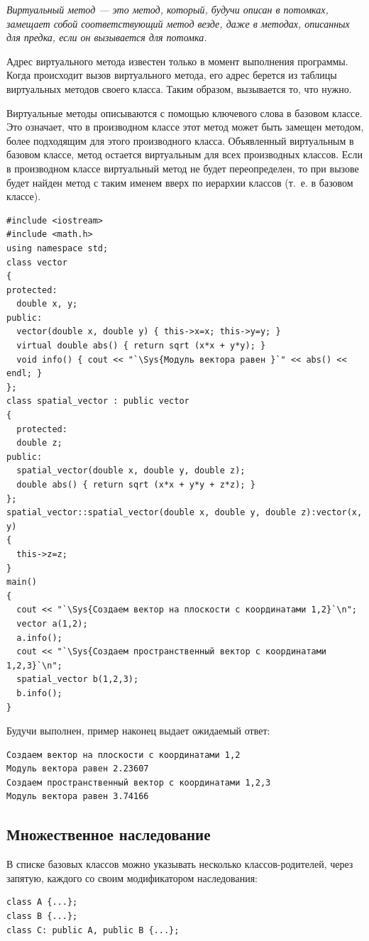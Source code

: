 \emph{Виртуальный метод --- это метод, который, будучи описан в потомках, замещает
собой соответствующий метод везде, даже в методах, описанных для предка, если он вызывается для потомка.}

Адрес виртуального метода известен только в момент выполнения программы. Когда происходит вызов виртуального метода, его
адрес берется из таблицы виртуальных методов своего класса. Таким образом, вызывается то, что нужно.

Виртуальные методы описываются с помощью ключевого слова  в базовом классе. Это означает,
что в производном классе этот метод может быть замещен методом, более подходящим для этого производного класса.
Объявленный виртуальным в базовом классе, метод остается виртуальным для всех производных классов. Если в производном
классе виртуальный метод не будет переопределен, то при вызове будет найден метод с таким именем вверх по иерархии
классов (т.~е. в базовом классе).
\begin{lstlisting}
#include <iostream>
#include <math.h>
using namespace std;
class vector 
{
protected:
  double x, y;
public:
  vector(double x, double y) { this->x=x; this->y=y; }
  virtual double abs() { return sqrt (x*x + y*y); }
  void info() { cout << "`\Sys{Модуль вектора равен }`" << abs() << endl; }
};
class spatial_vector : public vector 
{
  protected:
  double z;
public:
  spatial_vector(double x, double y, double z);
  double abs() { return sqrt (x*x + y*y + z*z); }
};
spatial_vector::spatial_vector(double x, double y, double z):vector(x, y) 
{
  this->z=z;
}
main() 
{
  cout << "`\Sys{Создаем вектор на плоскости с координатами 1,2}`\n";
  vector a(1,2);
  a.info();
  cout << "`\Sys{Создаем пространственный вектор с координатами 1,2,3}`\n";
  spatial_vector b(1,2,3);
  b.info();
}
\end{lstlisting}

Будучи выполнен, пример наконец выдает ожидаемый ответ:
\begin{verbatim}
Создаем вектор на плоскости с координатами 1,2 
Модуль вектора равен 2.23607 
Создаем пространственный вектор с координатами 1,2,3 
Модуль вектора равен 3.74166 
\end{verbatim}

\subsection[Множественное наследование]{Множественное наследование}
В списке базовых классов можно указывать несколько классов-родителей,
через запятую, каждого со своим модификатором наследования:
\begin{lstlisting}
class A {...};
class B {...};
class C: public A, public B {...};
\end{lstlisting}

